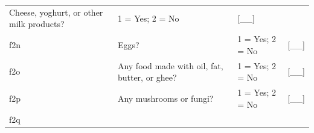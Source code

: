 \documentclass[12pt,a4paper]{book}
\theoremstyle{definition}
\theoremstyle{definition}
\theoremstyle{definition}
\theoremstyle{remark}
\begin{document}
\begin{longtable}[]{@{}llll@{}}
\begin{minipage}[t]{0.41\columnwidth}
Cheese, yoghurt, or other milk products?\strut
\end{minipage} & \begin{minipage}[t]{0.25\columnwidth}\raggedright
1 = Yes; 2 = No\strut
\end{minipage} & \begin{minipage}[t]{0.13\columnwidth}\raggedright
{[}\_\_{]}\strut
\end{minipage}\tabularnewline
\begin{minipage}[t]{0.09\columnwidth}\raggedright
f2n\strut
\end{minipage} & \begin{minipage}[t]{0.41\columnwidth}\raggedright
Eggs?\strut
\end{minipage} & \begin{minipage}[t]{0.25\columnwidth}\raggedright
1 = Yes; 2 = No\strut
\end{minipage} & \begin{minipage}[t]{0.13\columnwidth}\raggedright
{[}\_\_{]}\strut
\end{minipage}\tabularnewline
\begin{minipage}[t]{0.09\columnwidth}\raggedright
f2o\strut
\end{minipage} & \begin{minipage}[t]{0.41\columnwidth}\raggedright
Any food made with oil, fat, butter, or ghee?\strut
\end{minipage} & \begin{minipage}[t]{0.25\columnwidth}\raggedright
1 = Yes; 2 = No\strut
\end{minipage} & \begin{minipage}[t]{0.13\columnwidth}\raggedright
{[}\_\_{]}\strut
\end{minipage}\tabularnewline
\begin{minipage}[t]{0.09\columnwidth}\raggedright
f2p\strut
\end{minipage} & \begin{minipage}[t]{0.41\columnwidth}\raggedright
Any mushrooms or fungi?\strut
\end{minipage} & \begin{minipage}[t]{0.25\columnwidth}\raggedright
1 = Yes; 2 = No\strut
\end{minipage} & \begin{minipage}[t]{0.13\columnwidth}\raggedright
{[}\_\_{]}\strut
\end{minipage}\tabularnewline
\begin{minipage}[t]{0.09\columnwidth}\raggedright
f2q\strut
\end{minipage} & \begin{minipage}[t]{0.41\columnwidth}\raggedright

\end{minipage}
\end{longtable}
\end{document}
